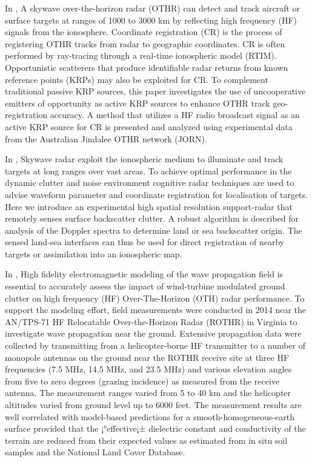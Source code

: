 In \cite{fabrizio2016using},
A skywave over-the-horizon radar (OTHR) can
detect and track aircraft or surface targets at ranges of
1000 to 3000 km by reflecting high frequency (HF) signals
from the ionosphere. Coordinate registration (CR) is the
process of registering OTHR tracks from radar to geographic
coordinates. CR is often performed by ray-tracing through a
real-time ionospheric model (RTIM). Opportunistic scatterers
that produce identifiable radar returns from known reference
points (KRPs) may also be exploited for CR. To complement
traditional passive KRP sources, this paper investigates the use
of uncooperative emitters of opportunity as active KRP sources
to enhance OTHR track geo-registration accuracy. A method
that utilizes a HF radio broadcast signal as an active KRP
source for CR is presented and analyzed using experimental
data from the Australian Jindalee OTHR network (JORN).


In \cite{turley2013high}, Skywave radar exploit the ionospheric medium to illuminate and track targets at long ranges over vast areas. To achieve optimal performance in the dynamic clutter and noise environment cognitive radar techniques are used to advise waveform parameter and coordinate registration for localisation of targets. Here we introduce an experimental high spatial resolution support-radar that remotely senses surface backscatter clutter. A robust algorithm is described for analysis of the Doppler spectra to determine land or sea backscatter origin. The sensed land-sea interfaces can thus be used for direct registration of nearby targets or assimilation into an ionospheric map.

In \cite{coutts2015low}, High fidelity electromagnetic modeling of the wave propagation field is essential to accurately assess the impact of wind-turbine modulated ground clutter on high frequency (HF) Over-The-Horizon (OTH) radar performance. To support the modeling effort, field measurements were conducted in 2014 near the AN/TPS-71 HF Relocatable Over-the-Horizon Radar (ROTHR) in Virginia to investigate wave propagation near the ground. Extensive propagation data were collected by transmitting from a helicopter-borne HF transmitter to a number of monopole antennas on the ground near the ROTHR receive site at three HF frequencies (7.5 MHz, 14.5 MHz, and 23.5 MHz) and various elevation angles from five to zero degrees (grazing incidence) as measured from the receive antenna. The measurement ranges varied from 5 to 40 km and the helicopter altitudes varied from ground level up to 6000 feet. The measurement results are well correlated with model-based predictions for a smooth-homogeneous-earth surface provided that the ¡°effective¡± dielectric constant and conductivity of the terrain are reduced from their expected values as estimated from in situ soil samples and the National Land Cover Database.



